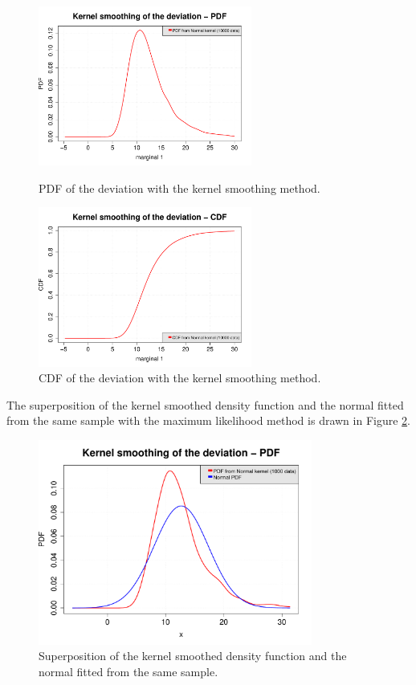 \documentclass[11pt]{article}
\begin{document}
\begin{figure}[Hhbtp]
  \begin{minipage}{9.8cm}
    \begin{center}
      \includegraphics[width=7cm]{Figures/smoothedPDF.pdf}
      \caption{PDF of the deviation with the kernel smoothing method.}
      \label{KernelSmoothing}
    \end{center}
  \end{minipage}
  \hfill
  \begin{minipage}{9.8cm}
    \begin{center}
      \includegraphics[width=7cm]{Figures/smoothedCDF.pdf}
      \caption{CDF of the deviation with the kernel smoothing method.}
      \label{KernelSmoothing2}
    \end{center}
  \end{minipage}
\end{figure}


The superposition of the kernel smoothed density function and the normal fitted from the same sample with the maximum likelihood method is drawn in Figure \ref{superp}.


\begin{figure}[Hhbtp]
  \begin{center}
    \includegraphics[width=9cm]{Figures/smoothedPDF_and_GaussianPDF.pdf}
  \end{center}
  \caption{Superposition of the kernel smoothed density function and the normal fitted from the same sample.}
  \label{superp}
\end{figure}
\end{document}
